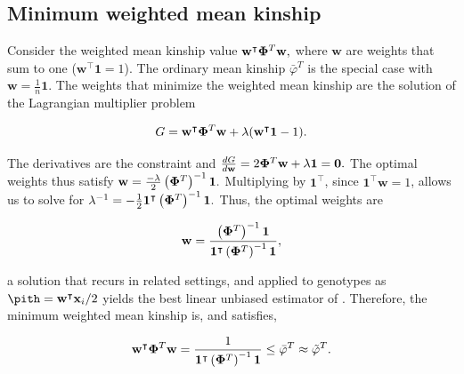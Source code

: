 \documentclass[11pt]{article}
\newcommand{\kinMat}[1][T]{%
  \ensuremath{%
    \mathbf{\Phi}^{#1}
  }%
  \xspace%
}%
\begin{document}
\begin{linenumbers}
\begin{appendices}
  \section{Minimum weighted mean kinship}

  \label{sec:min_w_mean_kin}

  Consider the weighted mean kinship value
  $
  \mathbf{w}^\intercal \kinMat \mathbf{w},
  $
  where $\mathbf{w}$ are weights that sum to one ($\mathbf{w}^\intercal \mathbf{1} = 1$).
  The ordinary mean kinship $\bar{\varphi}^T$ is the special case with $\mathbf{w} = \frac{1}{n} \mathbf{1}$.
  The weights that minimize the weighted mean kinship are the solution of the Lagrangian multiplier problem
  \begin{linenomath*}
  $$
  G = \mathbf{w}^\intercal \kinMat \mathbf{w} + \lambda (\mathbf{w}^\intercal \mathbf{1} - 1).
  $$
  \end{linenomath*}
  The derivatives are the constraint and
  $
  \frac{dG}{d \mathbf{w}}
  =
  2 \kinMat \mathbf{w} + \lambda \mathbf{1} = \mathbf{0}.
  $
  The optimal weights thus satisfy
  $
  \mathbf{w} = \frac{-\lambda}{2} \left( \kinMat \right)^{-1} \mathbf{1}.
  $
  Multiplying by $\mathbf{1}^\intercal$, since $\mathbf{1}^\intercal \mathbf{w} = 1$, allows us to solve for 
  $
  \lambda^{-1} = - \frac{1}{2} \mathbf{1}^\intercal \left( \kinMat \right)^{-1} \mathbf{1}.
  $
  Thus, the optimal weights are
  \begin{linenomath*}
  $$
  \mathbf{w}
  = 
  \frac{ \left( \kinMat \right)^{-1} \mathbf{1} }{ \mathbf{1}^\intercal \left( \kinMat \right)^{-1} \mathbf{1} }
  ,
  $$
  \end{linenomath*}
  a solution that recurs in related settings, and applied to genotypes as $\pith = \mathbf{w}^\intercal \mathbf{x}_i / 2$ yields the best linear unbiased estimator of \pit \citep{altschul_weights_1989, astle_population_2009, thornton_roadtrips:_2010}.
  Therefore, the minimum weighted mean kinship is, and satisfies,
  \begin{linenomath*}
  $$
  \mathbf{w}^\intercal \kinMat \mathbf{w}
  =
  \frac{ 1 }{ \mathbf{1}^\intercal \left( \kinMat \right)^{-1} \mathbf{1} }
  \le
  \bar{\varphi}^T
  \approx
  \tilde{\varphi}^T
  .
  $$
  \end{linenomath*}
    

\end{appendices}
\end{linenumbers}
\end{document}
